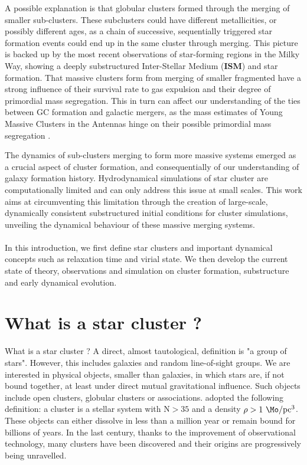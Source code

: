 A possible explanation is that globular clusters formed through the merging of smaller sub-clusters. These subclusters could have different metallicities, or possibly different ages, as a chain of successive, sequentially triggered star formation events could end up in the same cluster through merging. This picture is backed up by the most recent observations of star-forming regions in the Milky Way, showing a deeply substructured Inter-Stellar Medium (\textbf{ISM}) and star formation. That massive clusters form from merging of smaller fragmented have a strong influence of their survival rate to gas expulsion and their degree of primordial mass segregation. This in turn can affect our understanding of the ties between GC formation and galactic mergers, as the mass estimates of Young Massive Clusters in the Antennas hinge on their possible primordial mass segregation \citep{McCrady2005}.

The dynamics of sub-clusters merging to form more massive systems emerged as a crucial aspect of cluster formation, and consequentially of our understanding of galaxy formation history. Hydrodynamical simulations of star cluster are computationally limited and can only address this issue at small scales. This work aims at circumventing this limitation through the creation of large-scale, dynamically consistent substructured initial conditions for cluster simulations, unveiling the dynamical behaviour of these massive merging systems.

\paragraph*{}
In this introduction, we first define star clusters and important dynamical concepts such as relaxation time and virial state. We then develop the current state of theory, observations and simulation on cluster formation, substructure and early dynamical evolution.






\section{What is a star cluster ?}


 What is a star cluster ? A direct, almost tautological, definition is "a group of stars". However, this includes galaxies and random line-of-sight groups. We are interested in physical objects, smaller than galaxies, in which stars are, if not bound together, at least under direct mutual gravitational influence. Such objects include open clusters, globular clusters or associations.  \cite{Lada2003} adopted the following definition: a cluster is a stellar system with N$>35$ and a density $\rho > 1~\Mo /\textrm{pc}^3$. These objects can either dissolve in less than a million year or remain bound for billions of years. In the last century, thanks to the improvement of observational technology, many  clusters have been discovered and their origins are progressively being unravelled.


